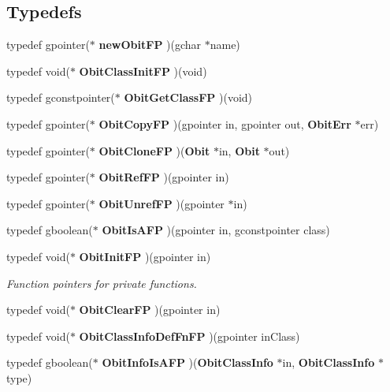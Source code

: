 \subsection*{Typedefs}
\begin{CompactItemize}
\item 
typedef gpointer($\ast$ {\bf new\-Obit\-FP} )(gchar $\ast$name)
\item 
typedef void($\ast$ {\bf Obit\-Class\-Init\-FP} )(void)
\item 
typedef gconstpointer($\ast$ {\bf Obit\-Get\-Class\-FP} )(void)
\item 
typedef gpointer($\ast$ {\bf Obit\-Copy\-FP} )(gpointer in, gpointer out, {\bf Obit\-Err} $\ast$err)
\item 
typedef gpointer($\ast$ {\bf Obit\-Clone\-FP} )({\bf Obit} $\ast$in, {\bf Obit} $\ast$out)
\item 
typedef gpointer($\ast$ {\bf Obit\-Ref\-FP} )(gpointer in)
\item 
typedef gpointer($\ast$ {\bf Obit\-Unref\-FP} )(gpointer $\ast$in)
\item 
typedef gboolean($\ast$ {\bf Obit\-Is\-AFP} )(gpointer in, gconstpointer class)
\item 
typedef void($\ast$ {\bf Obit\-Init\-FP} )(gpointer in)
\begin{CompactList}\small\item\em Function pointers for private functions. \item\end{CompactList}\item 
typedef void($\ast$ {\bf Obit\-Clear\-FP} )(gpointer in)
\item 
typedef void($\ast$ {\bf Obit\-Class\-Info\-Def\-Fn\-FP} )(gpointer in\-Class)
\item 
typedef gboolean($\ast$ {\bf Obit\-Info\-Is\-AFP} )({\bf Obit\-Class\-Info} $\ast$in, {\bf Obit\-Class\-Info} $\ast$type)
\end{CompactItemize}
